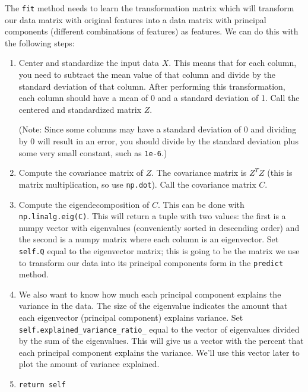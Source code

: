 \documentclass{article}
\begin{document}
The \texttt{fit} method needs to learn the transformation matrix which will transform our data matrix with original features into a data matrix with principal components (different combinations of features) as features. We can do this with the following steps:

\begin{enumerate}
    \item Center and standardize the input data $X$. This means that for each column, you need to subtract the mean value of that column and divide by the standard deviation of that column. After performing this transformation, each column should have a mean of 0 and a standard deviation of 1. Call the centered and standardized matrix $Z$.
    
    (Note: Since some columns may have a standard deviation of 0 and dividing by 0 will result in an error, you should divide by the standard deviation plus some very small constant, such as \texttt{1e-6}.)
    
    \item Compute the covariance matrix of $Z$. The covariance matrix is $Z^T Z$ (this is matrix multiplication, so use \texttt{np.dot}). Call the covariance matrix $C$.
    
    \item Compute the eigendecomposition of $C$. This can be done with \texttt{np.linalg.eig(C)}. This will return a tuple with two values: the first is a numpy vector with eigenvalues (conveniently sorted in descending order) and the second is a numpy matrix where each column is an eigenvector. Set \texttt{self.Q} equal to the eigenvector matrix; this is going to be the matrix we use to transform our data into its principal components form in the \texttt{predict} method.
    
    \item We also want to know how much each principal component explains the variance in the data. The size of the eigenvalue indicates the amount that each eigenvector (principal component) explains variance. Set \texttt{self.explained\_variance\_ratio\_} equal to the vector of eigenvalues divided by the sum of the eigenvalues. This will give us a vector with the percent that each principal component explains the variance. We'll use this vector later to plot the amount of variance explained.
    
    \item \texttt{return self}
\end{enumerate}
\end{document}
